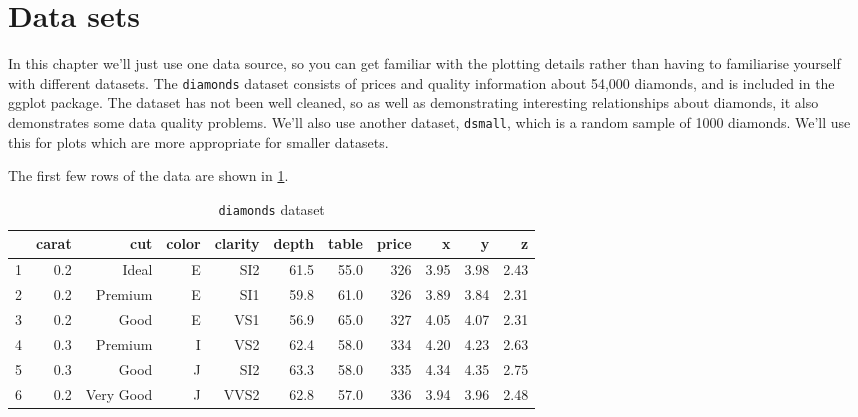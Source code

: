 \section{Data sets}\label{sec:data_sets}

In this chapter we'll just use one data source, so you can get familiar with the plotting details rather than having to familiarise yourself with different datasets.  The {\tt diamonds} dataset consists of prices and quality information about 54,000 diamonds, and is included in the ggplot package.  The dataset has not been well cleaned, so as well as demonstrating interesting relationships about diamonds, it also demonstrates some data quality problems.  We'll also use another dataset, {\tt dsmall}, which is a random sample of 1000 diamonds.  We'll use this for plots which are more appropriate for smaller datasets.

The first few rows of the data are shown in \ref{tab:diamonds}.

\begin{table}[ht]
\begin{center}
\begin{tabular}{l|rrrrrrrrrr}
  \hline
 & carat & cut & color & clarity & depth & table & price & x & y & z \\
  \hline
1 & 0.2 & Ideal & E & SI2 & 61.5 & 55.0 & 326 & 3.95 & 3.98 & 2.43 \\
  2 & 0.2 & Premium & E & SI1 & 59.8 & 61.0 & 326 & 3.89 & 3.84 & 2.31 \\
  3 & 0.2 & Good & E & VS1 & 56.9 & 65.0 & 327 & 4.05 & 4.07 & 2.31 \\
  4 & 0.3 & Premium & I & VS2 & 62.4 & 58.0 & 334 & 4.20 & 4.23 & 2.63 \\
  5 & 0.3 & Good & J & SI2 & 63.3 & 58.0 & 335 & 4.34 & 4.35 & 2.75 \\
  6 & 0.2 & Very Good & J & VVS2 & 62.8 & 57.0 & 336 & 3.94 & 3.96 & 2.48 \\
   \hline
\end{tabular}
\caption{{\tt diamonds} dataset}
\label{tab:diamonds}
\end{center}
\end{table}

